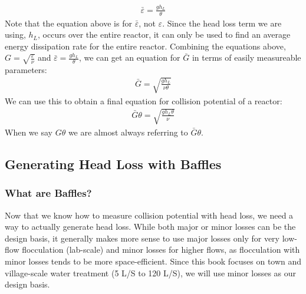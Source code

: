 \documentclass[letterpaper,10pt,english]{sphinxmanual}
\begin{document}
\begin{equation}\label{equation:Flocculation/Floc_Design:Flocculation/Floc_Design:4}
\begin{split}\bar \varepsilon = \frac{g h_L}{\theta}\end{split}
\end{equation}
Note that the equation above is for \(\bar \varepsilon\), not \(\varepsilon\). Since the head loss term we are using, \(h_L\), occurs over the entire reactor, it can only be used to find an average energy dissipation rate for the entire reactor. Combining the equations above, \(G = \sqrt{\frac{\varepsilon}{\nu}}\) and \(\bar \varepsilon = \frac{g h_L}{\theta}\), we can get an equation for \(\bar G\) in terms of easily measureable parameters:
\begin{equation}\label{equation:Flocculation/Floc_Design:Flocculation/Floc_Design:5}
\begin{split}\bar G = \sqrt{\frac{g h_L}{\nu \theta}}\end{split}
\end{equation}
We can use this to obtain a final equation for collision potential of a reactor:
\begin{equation}\label{equation:Flocculation/Floc_Design:Flocculation/Floc_Design:6}
\begin{split}\bar G \theta = \sqrt{\frac{g h_L \theta}{\nu}}\end{split}
\end{equation}
 When we say \(G \theta\) we are almost always referring to \(\bar G \theta\).


\subsection{Generating Head Loss with Baffles}
\label{\detokenize{Flocculation/Floc_Design:generating-head-loss-with-baffles}}

\subsubsection{What are Baffles?}
\label{\detokenize{Flocculation/Floc_Design:what-are-baffles}}
Now that we know how to measure collision potential with head loss, we need a way to actually generate head loss. While both major or minor losses can be the design basis, it generally makes more sense to use major losses only for very low-flow flocculation (lab-scale) and minor losses for higher flows, as flocculation with minor losses tends to be more space-efficient. Since this book focuses on town and village-scale water treatment (5 L/S to 120 L/S), we will use minor losses as our design basis.
\end{document}
